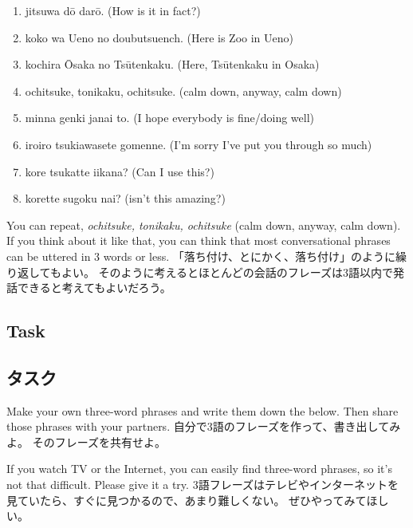 \documentclass[uplatex,dvipdfmx,b5paper,english,10pt]{jsbook}
\begin{document}
\begin{enumerate}
 \item jitsuwa d\=o dar\=o. (How is it in fact?)%
 \item koko wa Ueno no doubutsuench. (Here is Zoo in Ueno)%
 \item kochira \=Osaka no Ts\=utenkaku. (Here, Ts\=utenkaku in Osaka)%
 \item ochitsuke, tonikaku, ochitsuke. (calm down, anyway, calm down)%
 \item minna genki janai to. (I hope everybody is fine/doing well)
 \item iroiro tsukiawasete gomenne. (I'm sorry I've put you through so much)%
 \item kore tsukatte iikana? (Can I use this?)%
 \item korette sugoku nai? (isn't this amazing?) %
\end{enumerate}

\begin{toianswer}
\ifEnglish
You can repeat, {\it ochitsuke, tonikaku, ochitsuke\/} (calm down, anyway, calm down).
If you think about it like that, you can think that most conversational phrases can be uttered in 3 words or less.
\else
「落ち付け、とにかく、落ち付け」のように繰り返してもよい。
そのように考えるとほとんどの会話のフレーズは3語以内で発話できると考えてもよいだろう。
\fi
\end{toianswer}

\ifEnglish
\subsection{Task}
\else
\subsection{タスク}
\fi

\begin{toiquestion}
\ifEnglish
Make your own three-word phrases and write them down the below.
Then share those phrases with your partners.
\else
自分で3語のフレーズを作って、書き出してみよ。
そのフレーズを共有せよ。
\fi
\end{toiquestion}
\begin{toianswer}
\ifEnglish
If you watch TV or the Internet, you can easily find three-word phrases, so it's not that difficult.
Please give it a try.
\else
3語フレーズはテレビやインターネットを見ていたら、すぐに見つかるので、あまり難しくない。
ぜひやってみてほしい。
\fi
\end{toianswer}
\end{document}
